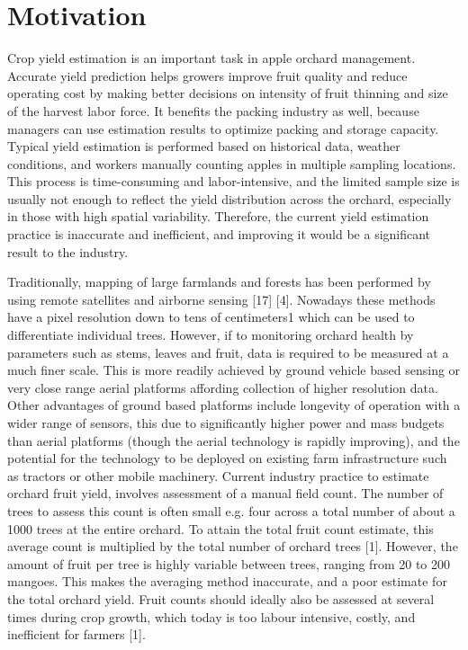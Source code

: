 \documentclass[12pt]{article}
\begin{document}
\section{Motivation}

Crop yield estimation is an important task in apple orchard management. Accurate yield prediction helps growers improve fruit quality and reduce operating cost
by making better decisions on intensity of fruit thinning and size of the harvest labor force. It benefits the packing industry as well, because managers can use estimation results to optimize packing and storage capacity. Typical yield estimation
is performed based on historical data, weather conditions, and workers manually
counting apples in multiple sampling locations. This process is time-consuming
and labor-intensive, and the limited sample size is usually not enough to reflect the
yield distribution across the orchard, especially in those with high spatial variability. Therefore, the current yield estimation practice is inaccurate and inefficient,
and improving it would be a significant result to the industry. 





Traditionally, mapping of large farmlands and forests has been performed by using remote satellites and airborne sensing [17] [4]. Nowadays these methods have
a pixel resolution down to tens of centimeters1 which can be used to differentiate
individual trees. However, if to monitoring orchard health by parameters such
as stems, leaves and fruit, data is required to be measured at a much finer scale.
This is more readily achieved by ground vehicle based sensing or very close range
aerial platforms affording collection of higher resolution data.
Other advantages of ground based platforms include longevity of operation with
a wider range of sensors, this due to significantly higher power and mass budgets
than aerial platforms (though the aerial technology is rapidly improving), and
the potential for the technology to be deployed on existing farm infrastructure
such as tractors or other mobile machinery.
Current industry practice to estimate orchard fruit yield, involves assessment of
a manual field count. The number of trees to assess this count is often small e.g.
four across a total number of about a 1000 trees at the entire orchard. To attain
the total fruit count estimate, this average count is multiplied by the total number
of orchard trees [1]. However, the amount of fruit per tree is highly variable between trees, ranging from 20 to 200 mangoes. This makes the averaging method
inaccurate, and a poor estimate for the total orchard yield. Fruit counts should ideally also be assessed at several times during crop growth, which today is too
labour intensive, costly, and inefficient for farmers [1].
\end{document}
